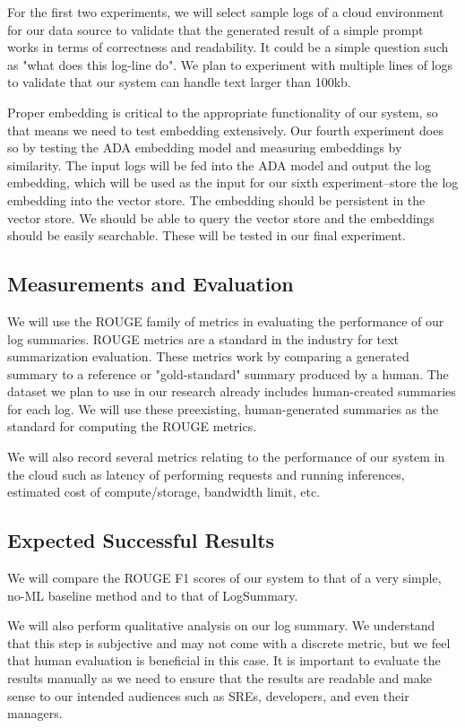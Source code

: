 \documentclass[conference]{IEEEtran}
\begin{document}
For the first two experiments, we will select sample logs of a cloud environment for our data source to validate that the generated result of a simple prompt works in terms of correctness and readability. It could be a simple question such as "what does this log-line do". We plan to experiment with multiple lines of logs to validate that our system can handle text larger than 100kb.

Proper embedding is critical to the appropriate functionality of our system, so that means we need to test embedding extensively. Our fourth experiment does so by testing the ADA embedding model and measuring embeddings by similarity. The input logs will be fed into the ADA model and output the log embedding, which will be used as the input for our sixth experiment--store the log embedding into the vector store. The embedding should be persistent in the vector store. We should be able to query the vector store and the embeddings should be easily searchable. These will be tested in our final experiment.


\subsection{Measurements and Evaluation}
We will use the ROUGE family of metrics in evaluating the performance of our log summaries. \cite{lin2004rouge} ROUGE metrics are a standard in the industry for text summarization evaluation. These metrics work by comparing a generated summary to a reference or "gold-standard" summary produced by a human. The dataset we plan to use in our research already includes human-created summaries for each log. We will use these preexisting, human-generated summaries as the standard for computing the ROUGE metrics.

We will also record several metrics relating to the performance of our system in the cloud such as latency of performing requests and running inferences, estimated cost of compute/storage, bandwidth limit, etc.

\subsection{Expected Successful Results}
We will compare the ROUGE F1 scores of our system to that of a very simple, no-ML baseline method \cite{medium-text-summarization} and to that of LogSummary. \cite{10017337}

We will also perform qualitative analysis on our log summary. We understand that this step is subjective and may not come with a discrete metric, but we feel that human evaluation is beneficial in this case. It is important to evaluate the results manually as we need to ensure that the results are readable and make sense to our intended audiences such as SREs, developers, and even their managers.
\end{document}
